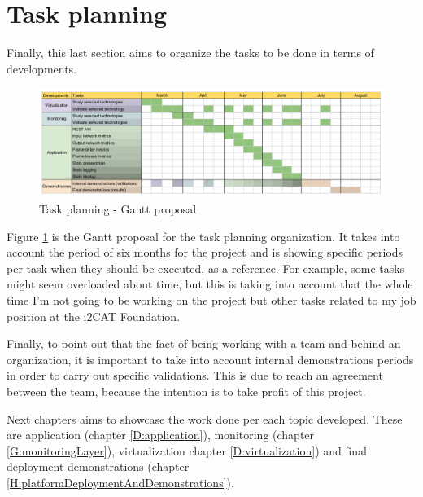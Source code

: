 \section{Task planning}

Finally, this last section aims to organize the tasks to be done in terms of developments. 

\begin{figure}[!htb]
\begin{center}
\includegraphics[width=1\textwidth]{./images/gantt.png}
\caption{Task planning - Gantt proposal}
\label{F:tpgp}
\end{center}
\end{figure}

Figure \ref{F:tpgp} is the Gantt proposal for the task planning organization. It takes into account the period of six months for the project and is showing specific periods per task when they should be executed, as a reference. For example, some tasks might seem overloaded about time, but this is taking into account that the whole time I'm not going to be working on the project but other tasks related to my job position at the i2CAT Foundation.

Finally, to point out that the fact of being working with a team and behind an organization, it is important to take into account internal demonstrations periods in order to carry out specific validations. This is due to reach an agreement between the team, because the intention is to take profit of this project.

Next chapters aims to showcase the work done per each topic developed. These are application (chapter \ref{D:application}), monitoring (chapter \ref{G:monitoringLayer}), virtualization chapter \ref{D:virtualization}) and final deployment demonstrations (chapter \ref{H:platformDeploymentAndDemonstrations}). 
